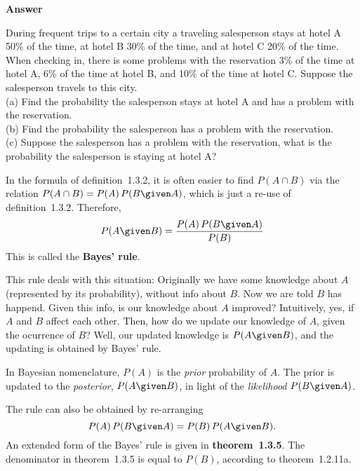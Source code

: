 \documentclass[12pt]{article}
\begin{document}
\textbf{Answer}


\example
During frequent trips to a certain
city a traveling salesperson stays at hotel A 50\% of the time,
at hotel B 30\% of the time, and at hotel C 20\% of the time.
When checking in, there is some problems with the reservation 3\%
of the time at hotel A, 6\% of the time at hotel B,
and 10\% of the time at hotel C.
Suppose the salesperson travels to this city.
\\
(a) Find the probability the salesperson stays at hotel A and has a
problem with the reservation.\\
(b) Find the probability the salesperson has a problem with the
reservation.\\
(c) Suppose the salesperson has a problem with the reservation, what is
the probability the salesperson is staying at hotel A?

\hrulefill

In the formula of definition~1.3.2,
it is often easier to find $P(A \cap B)$ via the relation
$P(A \cap B) = P(A)\, P(B \given A)$,
which is just a re-use of definition~1.3.2.
Therefore,
\[
P(A \given B) = \frac{P(A)\, P(B \given A)}{P(B)}
\]
This is called the \textbf{Bayes' rule}.

This rule deals with this situation:
Originally we have some knowledge about $A$ (represented by its
probability), without info about $B$.
Now we are told $B$ has happend.
Given this info, is our knowledge about $A$ improved?
Intuitively, yes, if $A$ and $B$ affect each other.
Then, how do we update our knowledge of $A$, given the ocurrence of $B$?
Well, our updated knowledge is $P(A \given B)$, and the updating is
obtained by Bayes' rule.

In Bayesian nomenclature,
$P(A)$ is the \emph{prior} probability of $A$.
The prior is updated to the \emph{posterior},
$P(A \given B)$, in light of the \emph{likelihood}
$P(B \given A)$.

The rule can also be obtained by re-arranging
\[
P(A)\, P(B\given A) = P(B)\, P(A\given B).
\]
An extended form of the Bayes' rule is given in
\textbf{theorem~1.3.5}.
The denominator in theorem~1.3.5 is equal to $P(B)$,
according to theorem~1.2.11a.
\end{document}

